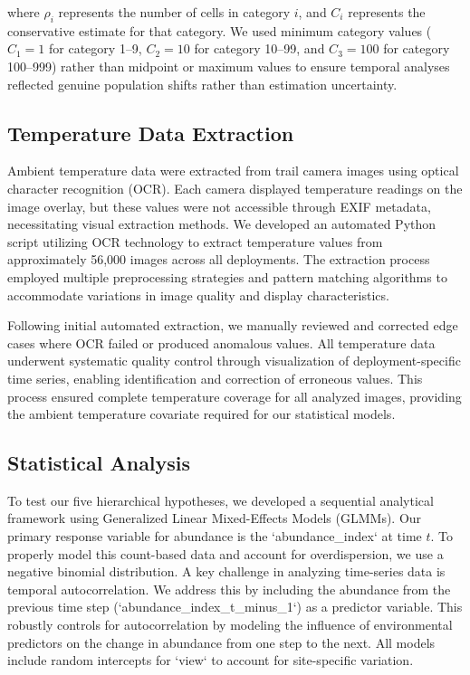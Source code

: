 where $\rho_i$ represents the number of cells in category $i$, and $C_i$ represents the conservative estimate for that category. We used minimum category values ($C_1 = 1$ for category 1–9, $C_2 = 10$ for category 10–99, and $C_3 = 100$ for category 100–999) rather than midpoint or maximum values to ensure temporal analyses reflected genuine population shifts rather than estimation uncertainty.

\subsection{Temperature Data Extraction}

Ambient temperature data were extracted from trail camera images using optical character recognition (OCR). Each camera displayed temperature readings on the image overlay, but these values were not accessible through EXIF metadata, necessitating visual extraction methods. We developed an automated Python script utilizing OCR technology to extract temperature values from approximately 56,000 images across all deployments. The extraction process employed multiple preprocessing strategies and pattern matching algorithms to accommodate variations in image quality and display characteristics.

Following initial automated extraction, we manually reviewed and corrected edge cases where OCR failed or produced anomalous values. All temperature data underwent systematic quality control through visualization of deployment-specific time series, enabling identification and correction of erroneous values. This process ensured complete temperature coverage for all analyzed images, providing the ambient temperature covariate required for our statistical models.

\subsection{Statistical Analysis}
\label{sec:statistical-analysis}

To test our five hierarchical hypotheses, we developed a sequential analytical framework using Generalized Linear Mixed-Effects Models (GLMMs). Our primary response variable for abundance is the `abundance_index` at time $t$. To properly model this count-based data and account for overdispersion, we use a negative binomial distribution. A key challenge in analyzing time-series data is temporal autocorrelation. We address this by including the abundance from the previous time step (`abundance_index_t_minus_1`) as a predictor variable. This robustly controls for autocorrelation by modeling the influence of environmental predictors on the change in abundance from one step to the next. All models include random intercepts for `view` to account for site-specific variation.

